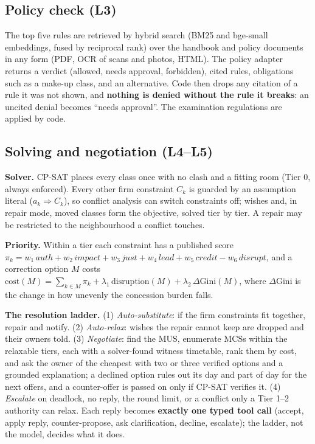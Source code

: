 \documentclass[11pt,a4paper]{article}
\begin{document}
\subsection{Policy check (L3)}
The top five rules are retrieved by hybrid search (BM25 and bge-small embeddings, fused by reciprocal rank) over the
handbook and policy documents in any form (PDF, OCR of scans and photos, HTML). The policy adapter returns a verdict
(allowed, needs approval, forbidden), cited rules, obligations such as a make-up class, and an alternative. Code
then drops any citation of a rule it was not shown, and \textbf{nothing is denied without the rule it breaks}: an
uncited denial becomes ``needs approval''. The examination regulations are applied by code.

\subsection{Solving and negotiation (L4--L5)}
\label{sec:method-neg}
\textbf{Solver.} CP-SAT places every class once with no clash and a fitting room (Tier 0, always enforced). Every
other firm constraint $C_k$ is guarded by an assumption literal ($a_k \Rightarrow C_k$), so conflict analysis can
switch constraints off; wishes and, in repair mode, moved classes form the objective, solved tier by tier. A repair
may be restricted to the neighbourhood a conflict touches.

\textbf{Priority.} Within a tier each constraint has a published score
$\pi_k = w_1\,\mathit{auth} + w_2\,\mathit{impact} + w_3\,\mathit{just} + w_4\,\mathit{lead} + w_5\,\mathit{credit}
- w_6\,\mathit{disrupt}$, and a correction option $M$ costs
$\mathrm{cost}(M) = \sum_{k\in M}\pi_k + \lambda_1\,\mathrm{disruption}(M) + \lambda_2\,\Delta\mathrm{Gini}(M)$,
where $\Delta\mathrm{Gini}$ is the change in how unevenly the concession burden falls.

\textbf{The resolution ladder.} (1) \emph{Auto-substitute}: if the firm constraints fit together, repair and
notify. (2) \emph{Auto-relax}: wishes the repair cannot keep are dropped and their owners told. (3) \emph{Negotiate}:
find the MUS, enumerate MCSs within the relaxable tiers, each with a solver-found witness timetable, rank them by
cost, and ask the owner of the cheapest with two or three verified options and a grounded explanation; a declined
option rules out its day and part of day for the next offers, and a counter-offer is passed on only if CP-SAT
verifies it. (4) \emph{Escalate} on deadlock, no reply, the round limit, or a conflict only a Tier 1--2 authority can
relax. Each reply becomes \textbf{exactly one typed tool call} (accept, apply reply, counter-propose, ask
clarification, decline, escalate); the ladder, not the model, decides what it does.
\end{document}
